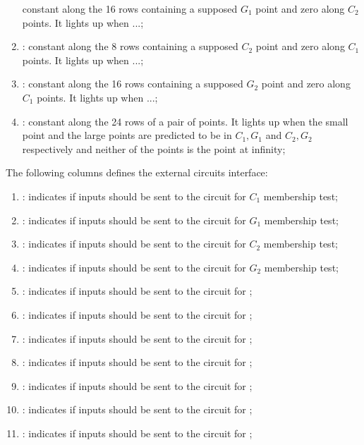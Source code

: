 \begin{enumerate}[resume]
            constant along the 16 rows containing a supposed $G_1$ point and zero along $C_2$ points. It lights up when ...;
      \item \both{\cTwoMembershipTestRequired}:
            constant along the 8 rows containing a supposed $C_2$ point and zero along $C_1$ points. It lights up when ...;
      \item \both{\gTwoMembershipTestRequired}:
            constant along the 16 rows containing a supposed $G_2$ point and zero along $C_1$ points. It lights up when ...;
      \item \both{\acceptablePairOfPoints}: constant along the 24 rows of a pair of points. It lights up when the small point and the large points are predicted to be in $C_1,G_1$ and $C_2, G_2$ respectively and neither of the points is the point at infinity;
\end{enumerate}
     
The following columns defines the external circuits interface:
\begin{enumerate}[resume]
      \item \both{\csCOne}: indicates if inputs should be sent to the circuit for $C_1$ membership test;
      \item \both{\csGOne}: indicates if inputs should be sent to the circuit for $G_1$ membership test;
      \item \both{\csCTwo}: indicates if inputs should be sent to the circuit for $C_2$ membership test;
      \item \both{\csGTwo}: indicates if inputs should be sent to the circuit for $G_2$ membership test;
      \item \both{\csPairing}: indicates if inputs should be sent to the circuit for ;
      \item \both{\csGOneAdd}: indicates if inputs should be sent to the circuit for ;
      \item \both{\csGTwoAdd}: indicates if inputs should be sent to the circuit for ;
      \item \both{\csGOneMsm}: indicates if inputs should be sent to the circuit for ;
      \item \both{\csGTwoMsm}: indicates if inputs should be sent to the circuit for ;
      \item \both{\csMapFpToGOne}: indicates if inputs should be sent to the circuit for ;
      \item \both{\csMapFpTwoToGTwo}: indicates if inputs should be sent to the circuit for ;
\end{enumerate}

